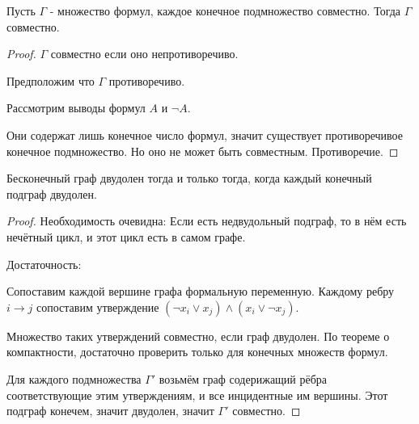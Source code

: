 \begin{theorem} \thmslashn

    Пусть $\Gamma$ - множество формул, каждое конечное подмножество совместно. Тогда $\Gamma$ совместно.
    \begin{proof} \thmslashn
    
        $\Gamma$ совместно если оно непротиворечиво.
        
        Предположим что $\Gamma$ противоречиво. 
        
        Рассмотрим выводы формул $A$ и $\neg A$.
    
        Они содержат лишь конечное число формул, значит существует противоречивое конечное подмножество. Но оно не может быть совместным. Противоречие.
    \end{proof}
\end{theorem}
\begin{theorem} \thmslashn

    Бесконечный граф двудолен тогда и только тогда, когда каждый конечный подграф двудолен.
    \begin{proof} \thmslashn
    
       Необходимость очевидна: Если есть недвудольный подграф, то в нём есть нечётный цикл, и этот цикл есть в самом графе.

        Достаточность:

        Сопоставим каждой вершине графа формальную переменную. Каждому ребру $i \to j$ сопоставим утверждение $(\neg x_{i} \lor x_{j}) \land (x_{i} \lor \neg x_{j})$. 

        Множество таких утверждений совместно, если граф двудолен. По теореме о компактности, достаточно проверить только для конечных множеств формул.

        Для каждого подмножества $\Gamma'$ возьмём граф содерижащий рёбра соответствующие этим утверждениям, и все инцидентные им вершины. Этот подграф конечем, значит двудолен, значит $\Gamma'$ совместно.
    \end{proof}
\end{theorem}
